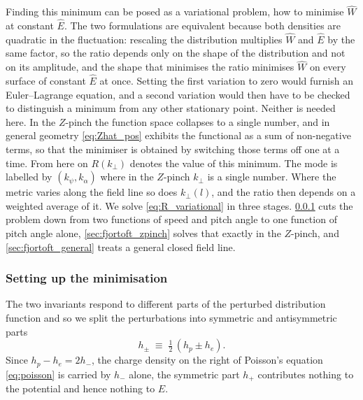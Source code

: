\documentclass{jpp}
\newcommand{\kperp}{k_\perp}
\begin{document}
Finding this minimum can be posed as a variational problem, how to minimise $\hat W$ at constant $\hat E$. The two formulations are equivalent because both densities are quadratic in the fluctuation: rescaling the distribution multiplies $\hat W$ and $\hat E$ by the same factor, so the ratio depends only on the shape of the distribution and not on its amplitude, and the shape that minimises the ratio minimises $\hat W$ on every surface of constant $\hat E$ at once. Setting the first variation to zero would furnish an Euler--Lagrange equation, and a second variation would then have to be checked to distinguish a minimum from any other stationary point. Neither is needed here. In the $Z$-pinch the function space collapses to a single number, and in general geometry \cref{eq:Zhat_pos} exhibits the functional as a sum of non-negative terms, so that the minimiser is obtained by switching those terms off one at a time. From here on $R(\kperp)$ denotes the value of this minimum. The mode is labelled by $(k_\psi, k_\alpha)$ where in the $Z$-pinch $\kperp$ is a single number. Where the metric varies along the field line so does $\kperp(l)$, and the ratio then depends on a weighted average of it. We solve \cref{eq:R_variational} in three stages. \cref{sec:fjortoft_setup} cuts the problem down from two functions of speed and pitch angle to one function of pitch angle alone, \cref{sec:fjortoft_zpinch} solves that exactly in the $Z$-pinch, and \cref{sec:fjortoft_general} treats a general closed field line.

\subsubsection{Setting up the minimisation}\label{sec:fjortoft_setup}

The two invariants respond to different parts of the perturbed distribution function and so we split the perturbations into symmetric and antisymmetric parts
\begin{equation}\label{eq:gpm_def}
h_\pm \;\equiv\; \tfrac{1}{2}\,(h_p \pm h_e).
\end{equation}
Since $h_p - h_e = 2 h_-$, the charge density on the right of Poisson's equation \cref{eq:poisson} is carried by $h_-$ alone, the symmetric part $h_+$ contributes nothing to the potential and hence nothing to $E$.
\end{document}
